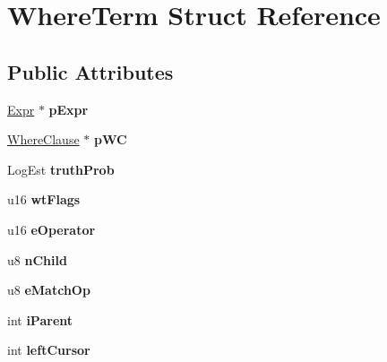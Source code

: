 \hypertarget{struct_where_term}{}\section{Where\+Term Struct Reference}
\label{struct_where_term}
\subsection*{Public Attributes}
\begin{DoxyCompactItemize}
\item 
\mbox{\label{struct_where_term_af5ec32fe3a2e4623c900cb91aa86bc9d}} 
\mbox{\hyperlink{struct_expr}{Expr}} $\ast$ {\bfseries p\+Expr}
\item 
\mbox{\label{struct_where_term_a1fb0a9ede5a12d6d2f7886431b348fb3}} 
\mbox{\hyperlink{struct_where_clause}{Where\+Clause}} $\ast$ {\bfseries p\+WC}
\item 
\mbox{\label{struct_where_term_a6e6c9c0c1b959f0f4d30a8a00ac4eeec}} 
Log\+Est {\bfseries truth\+Prob}
\item 
\mbox{\label{struct_where_term_a979984e12baf58f3661cb82d619a0786}} 
u16 {\bfseries wt\+Flags}
\item 
\mbox{\label{struct_where_term_af0b4817bee491fa1ee69a87d8ff580c5}} 
u16 {\bfseries e\+Operator}
\item 
\mbox{\label{struct_where_term_af83cf7bae7760b9b1ca398338a35c32a}} 
u8 {\bfseries n\+Child}
\item 
\mbox{\label{struct_where_term_abe8cd628313f30428729ca6b6b05899b}} 
u8 {\bfseries e\+Match\+Op}
\item 
\mbox{\label{struct_where_term_aa45e0b271713e429fbeba433941d2e22}} 
int {\bfseries i\+Parent}
\item 
\mbox{\label{struct_where_term_a82bb97ef4285d75b1b9c4fcd2025aaf7}} 
int {\bfseries left\+Cursor}
\item 
\mbox{\label{struct_where_term_a39a20cab7599056102a325d8f1f2c0d9}} 

\end{DoxyCompactItemize}

